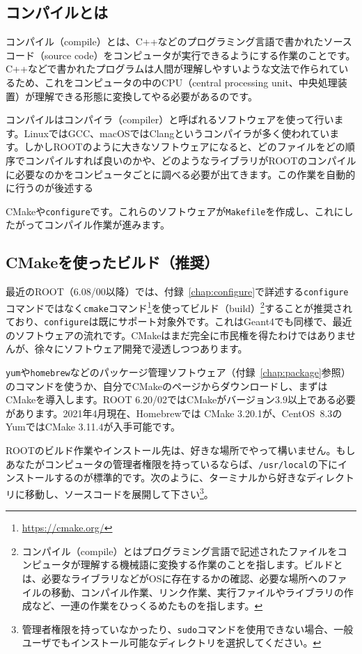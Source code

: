 \subsection{コンパイルとは}
コンパイル（compile）とは、C++などのプログラミング言語で書かれたソースコード（source code）をコンピュータが実行できるようにする作業のことです。C++などで書かれたプログラムは人間が理解しやすいような文法で作られているため、これをコンピュータの中のCPU（central processing unit、中央処理装置）が理解できる形態に変換してやる必要があるのです。

コンパイルはコンパイラ（compiler）と呼ばれるソフトウェアを使って行います。LinuxではGCC、macOSではClangというコンパイラが多く使われています。しかしROOTのように大きなソフトウェアになると、どのファイルをどの順序でコンパイルすれば良いのかや、どのようなライブラリがROOTのコンパイルに必要なのかをコンピュータごとに調べる必要が出てきます。この作業を自動的に行うのが後述する{CMakeや\texttt{configure}です。これらのソフトウェアが\texttt{Makefile}を作成し、これにしたがってコンパイル作業が進みます。

\subsection{CMakeを使ったビルド（推奨）}
\label{subsec:compile_cmake}
最近のROOT（6.08/00以降）では、付録~\ref{chap:configure}で詳述する\texttt{configure}コマンドではなく\texttt{cmake}コマンド\footnote{\url{https://cmake.org/}}を使ってビルド（build）\footnote{コンパイル（compile）とはプログラミング言語で記述されたファイルをコンピュータが理解する機械語に変換する作業のことを指します。ビルドとは、必要なライブラリなどがOSに存在するかの確認、必要な場所へのファイルの移動、コンパイル作業、リンク作業、実行ファイルやライブラリの作成など、一連の作業をひっくるめたものを指します。}することが推奨されており、\texttt{configure}は既にサポート対象外です。これはGeant4でも同様で、最近のソフトウェアの流れです。CMakeはまだ完全に市民権を得たわけではありませんが、徐々にソフトウェア開発で浸透しつつあります。

\texttt{yum}や\texttt{homebrew}などのパッケージ管理ソフトウェア（付録~\ref{chap:package}参照）のコマンドを使うか、自分でCMakeのページからダウンロードし、まずはCMakeを導入します。ROOT 6.20/02ではCMakeがバージョン3.9以上である必要があります。2021年4月現在、Homebrewでは CMake 3.20.1が、CentOS~8.3のYumではCMake 3.11.4が入手可能です。

ROOTのビルド作業やインストール先は、好きな場所でやって構いません。もしあなたがコンピュータの管理者権限を持っているならば、\texttt{/usr/local}の下にインストールするのが標準的です。次のように、ターミナルから好きなディレクトリに移動し、ソースコードを展開して下さい\footnote{管理者権限を持っていなかったり、\texttt{sudo}コマンドを使用できない場合、一般ユーザでもインストール可能なディレクトリを選択してください。}。

}
